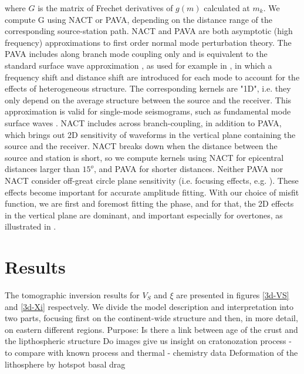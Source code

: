 \documentclass[12pt]{article}
\begin{document}
\noindent where $G$ is the matrix of Frechet derivatives of $g(m)$ calculated at $m_k$. We compute G using NACT or PAVA, depending on the distance range of the corresponding source-station path.
NACT and PAVA are both asymptotic (high frequency) approximations to first order normal mode perturbation theory. 
The PAVA includes along branch mode coupling only and is equivalent to the standard surface wave approximation \citep[e.g][]{mochizuki1986free,romanowicz1987multiplet}, as used for example in \cite{woodhouse1984mapping}, in which a frequency shift and distance shift are introduced for each mode to account for the effects of heterogeneous structure. 
The corresponding kernels are "1D", i.e. they only depend on the average structure between the source and the receiver. This approximation is valid for single-mode seismograms, such as fundamental mode surface waves \citep[e.g][]{romanowicz2008computation}.
NACT includes across branch-coupling, in addition to PAVA, which brings out 2D sensitivity of waveforms in the vertical plane containing the source and the receiver. NACT breaks down when the distance between the source and station is short, so we compute kernels using NACT for epicentral distances larger than $15^o$, and PAVA for shorter distances.
Neither PAVA nor NACT consider off-great circle plane sensitivity (i.e. focusing effects, e.g. \cite{zhou2005finite}). These effects become important for accurate amplitude fitting. With our choice of misfit function, we are first and foremost fitting the phase, and for that, the 2D effects in the vertical plane are dominant, and important especially for overtones, as illustrated in \cite{megnin1999effects,romanowicz2008computation}.


\section{Results}


	The tomographic inversion results for $V_S$ and $\xi$ are presented in figures \ref{3d-VS} and \ref{3d-Xi} respectvely. 
	We divide the model description and interpretation into two parts, focusing first on the continent-wide structure and then, in more detail, on eastern different regions.
	Purpose:
	Is there a link between age of the crust and the lipthospheric structure
	Do images give us insight on cratonozation process - to compare with known process and thermal - chemistry data
	Deformation of the lithosphere by hotspot basal drag

\end{document}
